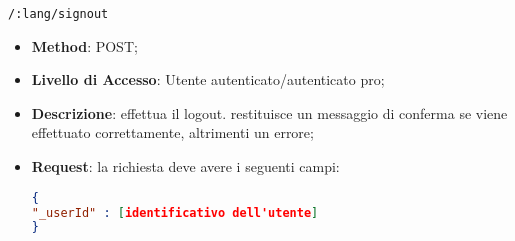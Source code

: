 	\item \texttt{/:lang/signout}
		\begin{itemize}
			\item \textbf{Method}: POST;
			\item \textbf{Livello di Accesso}: Utente autenticato/autenticato pro;
			\item \textbf{Descrizione}: effettua il logout. restituisce un messaggio di conferma se viene effettuato correttamente, altrimenti un errore;
			\item \textbf{Request}: la richiesta deve avere i seguenti campi:
\begin{lstlisting}[language=json,firstnumber=1]
{
"_userId" : [identificativo dell'utente]
}
\end{lstlisting}
		\end{itemize}
